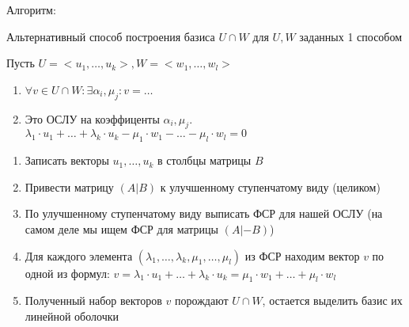 \bigskip

\begin{lemma} Алгоритм:

  Альтернативный способ построения базиса $U \cap W$ для $U, W$ заданных 1 способом

  Пусть $U = <u_1, \dots, u_k>, W = <w_1, \dots, w_l>$

  \begin{enumerate}
    \item $\forall v \in U \cap W: \exists \alpha_i, \mu_j: v = \dots$
    \item Это ОСЛУ на коэффиценты $\alpha_i, \mu_j$. $\lambda_1 \cdot u_1 + \dots + \lambda_k \cdot u_k - \mu_1 \cdot w_1 - \dots - \mu_l \cdot w_l = 0$
  \end{enumerate}

  \begin{enumerate}
    \item Записать векторы $u_1, \dots, u_k$ в столбцы матрицы $B$
    \item Привести матрицу $(A|B)$ к улучшенному ступенчатому виду (целиком)
    \item По улучшенному ступенчатому виду выписать ФСР для нашей ОСЛУ (на самом деле мы ищем ФСР для матрицы $(A|-B)$)
    \item Для каждого элемента $(\lambda_1, \dots, \lambda_k, \mu_1, \dots, \mu_l)$ из ФСР находим вектор $v$ по одной из формул: $v = \lambda_1 \cdot u_1 + \dots + \lambda_k \cdot u_k = \mu_1 \cdot w_1 + \dots + \mu_l \cdot w_l$
    \item Полученный набор векторов $v$ порождают $U \cap W$, остается выделить базис их линейной оболочки
  \end{enumerate}

  \begin{comment}
    Если $U, W$ заданы первым способом, то для нахождения базиса суммы нужно привести ту же матрицу $(A|B)$ к ступенчатому виду
  \end{comment}

\end{lemma}

\bigskip


